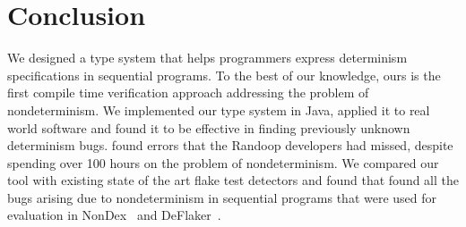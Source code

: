 \section{Conclusion}\label{sec:conclusion}


We designed a type system that helps programmers express determinism specifications
in sequential programs. To the best of our knowledge, ours is the
first compile time verification approach addressing the problem of nondeterminism.
We implemented our type system in Java, applied it to real world 
software and found it to be effective in finding previously unknown determinism bugs. 
\TheDeterminismChecker found errors that the
Randoop developers had missed, despite spending over 100 hours on the
problem of nondeterminism. We compared our tool with existing state of the art flake test detectors
and found that \TheDeterminismChecker found all the bugs arising due to nondeterminism
in sequential programs that were used for evaluation in NonDex~\cite{nondex} and DeFlaker~\cite{deflaker}.
